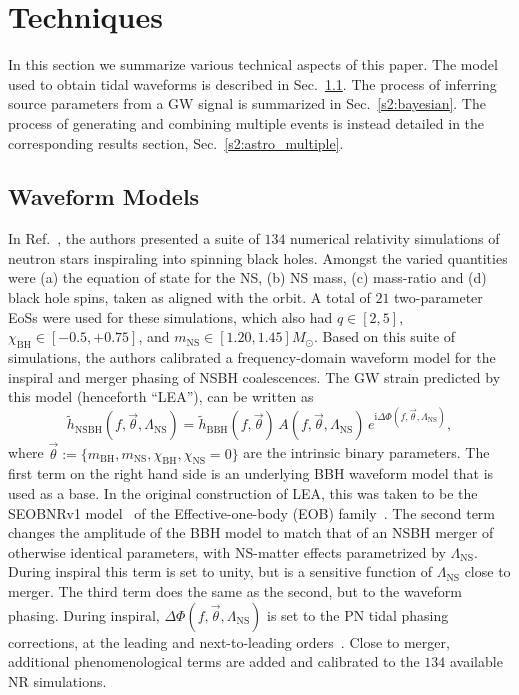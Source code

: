 \documentclass[aps,prd,amsmath,floats,floatfix, twocolumn,
superscriptaddress,nofootinbib,showpacs]{revtex4-1}
\newcommand{\lambdans}{\Lambda_\mathrm{NS}}
\newcommand{\ii}{\mathrm{i}}
\newcommand{\chibh}{\chi_\mathrm{BH}}
\newcommand{\chins}{\chi_\mathrm{NS}}
\newcommand{\mbh}{m_\mathrm{BH}}
\newcommand{\mns}{m_\mathrm{NS}}
\begin{document}
\section{Techniques}\label{s1:techniques}

In this section we summarize various technical aspects of this paper. The model
used to obtain tidal waveforms is described in Sec.~\ref{s2:waveforms}. The 
process of inferring source parameters from a GW signal is summarized in 
Sec.~\ref{s2:bayesian}. The process of generating and combining multiple events
is instead detailed in the corresponding results section,
Sec.~\ref{s2:astro_multiple}.

\subsection{Waveform Models}\label{s2:waveforms}

In Ref.~\cite{Lackey:2013axa}, the authors presented a suite of $134$ numerical
relativity simulations of neutron stars inspiraling into spinning black holes. Amongst
the varied quantities were (a) the equation of state for the NS, (b) NS mass, 
(c) mass-ratio and (d) black hole spins, taken as aligned with the orbit.
A total of $21$ two-parameter EoSs were used for these simulations, which also 
had $q\in[2, 5]$, $\chibh\in[-0.5, +0.75]$, and 
$m_\mathrm{NS}\in[1.20, 1.45]M_\odot$. Based on this suite of simulations, the
authors calibrated a frequency-domain waveform model for the inspiral and merger phasing of
NSBH coalescences. The GW strain predicted by this model (henceforth ``LEA''),
can be written as
% 
\begin{equation}
 \tilde{h}_\mathrm{NSBH}(f, \vec{\theta}, \lambdans) = \tilde{h}_\mathrm{BBH}(f, \vec{\theta})\,A(f, \vec{\theta}, \lambdans)\,e^{\ii \Delta\Phi(f, \vec{\theta}, \lambdans)},
\end{equation}
where $\vec{\theta}:=\{\mbh, \mns, \chibh,\chins=0\}$ are the intrinsic binary
parameters. The first term on the right hand side is an underlying
BBH waveform model that is used as a base. In the original construction of LEA,
this was taken to be the SEOBNRv1 model~\cite{Taracchini:2012} of the 
Effective-one-body (EOB) family~\cite{Buonanno99}. The second term changes the 
amplitude of the BBH model
to match that of an NSBH merger of otherwise identical parameters, with NS-matter
effects parametrized by $\lambdans$. During inspiral this term is set to
unity, but is a sensitive function of $\lambdans$ close to merger. The third 
term does the same as the second, but to the waveform phasing. During inspiral,
$\Delta\Phi(f, \vec{\theta}, \lambdans)$ is set to the PN tidal phasing corrections,
at the leading and next-to-leading orders~\cite{Vines2011}. Close to merger,
additional phenomenological terms are added and calibrated to the $134$ available
NR simulations.
\end{document}
